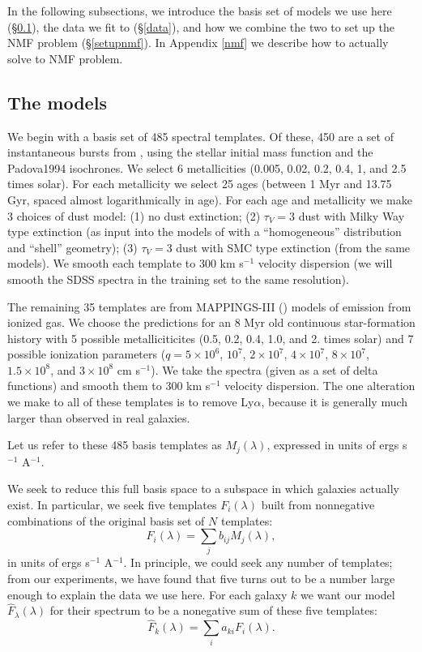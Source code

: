 \documentclass[10pt,preprint]{aastex}
\renewcommand{\AA}{A}
\begin{document}
In the following subsections, we introduce the basis set of models we
use here (\S\ref{models}), the data we fit to (\S\ref{data}), and how
we combine the two to set up the NMF problem (\S\ref{setupnmf}).  In
Appendix \ref{nmf} we describe how to actually solve to NMF problem.

\subsection{The models}
\label{models}

We begin with a basis set of 485 spectral templates. Of these, 450 are
a set of instantaneous bursts from \citet{bruzual03a}, using the
\citet{chabrier03a} stellar initial mass function and the Padova1994
isochrones. We select 6 metallicities (0.005, 0.02, 0.2, 0.4, 1, and
2.5 times solar). For each metallicity we select 25 ages (between 1
Myr and 13.75 Gyr, spaced almost logarithmically in age).  For each
age and metallicity we make 3 choices of dust model: (1) no dust
extinction; (2) $\tau_V = 3$ dust with Milky Way type extinction (as
input into the models of
\citealt{witt00a} with a ``homogeneous'' distribution and ``shell''
geometry); (3) $\tau_V = 3$ dust with SMC type extinction (from the
same models). We smooth each template to $300$ km s$^{-1}$ velocity
dispersion (we will smooth the SDSS spectra in the training set to the
same resolution). 

The remaining 35 templates are from MAPPINGS-III (\citealt{kewley01a})
models of emission from ionized gas. We choose the predictions for an
8 Myr old continuous star-formation history with 5 possible
metalliciticites (0.5, 0.2, 0.4, 1.0, and 2. times solar) and 7
possible ionization parameters ($q= 5\times 10^6$, $10^7$, $2\times
10^7$, $4\times 10^7$, $8 \times 10^7$, $1.5\times 10^8$, and $3\times
10^8$ cm s$^{-1}$). We take the spectra (given as a set of delta
functions) and smooth them to $300$ km s$^{-1}$ velocity
dispersion. The one alteration we make to all of these templates is to
remove Ly$\alpha$, because it is generally much larger than observed
in real galaxies.

Let us refer to these 485 basis templates as $M_{j}(\lambda)$,
expressed in units of ergs s$^{-1}$ \AA$^{-1}$.

We seek to reduce this full basis space to a subspace in which
galaxies actually exist. In particular, we seek five templates
$F_{i}(\lambda)$ built from nonnegative combinations of the
original basis set of $N$ templates:
\begin{equation}
F_{i}(\lambda) = \sum_j b_{ij} M_{j}(\lambda),
\end{equation}
in units of ergs s$^{-1}$ \AA$^{-1}$. In principle, we could seek any
number of templates; from our experiments, we have found that five
turns out to be a number large enough to explain the data we use
here. For each galaxy $k$ we want our model
${\hat{F}_\lambda}(\lambda)$ for their spectrum to be a nonegative sum
of these five templates:
\begin{equation}
{\hat{F}}_{k}(\lambda) = \sum_i a_{ki} F_{i}(\lambda).
\end{equation}
\end{document}
